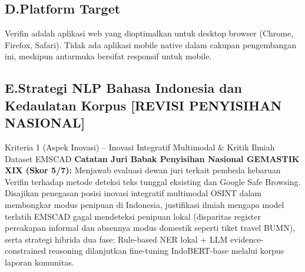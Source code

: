 \documentclass[12pt,a4paper]{article}
\begin{document}
\subsection*{D.\quad Platform Target}
Verifin adalah aplikasi web yang dioptimalkan untuk desktop browser (Chrome, Firefox, Safari).
Tidak ada aplikasi mobile native dalam cakupan pengembangan ini, meskipun antarmuka bersifat
responsif untuk mobile.

\subsection*{\colorbox{yellow!50}{\textbf{E.\quad Strategi NLP Bahasa Indonesia dan Kedaulatan Korpus}} \quad \colorbox{orange!25}{\small\textbf{[REVISI PENYISIHAN NASIONAL]}}}
{}

\begin{bannerpenyisihan}{Kriteria 1 (Aspek Inovasi) -- Inovasi Integratif Multimodal \& Kritik Ilmiah Dataset EMSCAD}
\textbf{Catatan Juri Babak Penyisihan Nasional GEMASTIK XIX (Skor 5/7):} Menjawab evaluasi dewan juri terkait pembeda kebaruan Verifin terhadap metode deteksi teks tunggal eksisting dan Google Safe Browsing. Disajikan penegasan posisi inovasi integratif multimodal OSINT dalam membongkar modus penipuan di Indonesia, justifikasi ilmiah mengapa model terlatih EMSCAD gagal mendeteksi penipuan lokal (disparitas register percakapan informal dan absennya modus domestik seperti tiket travel BUMN), serta strategi hibrida dua fase: Rule-based NER lokal + LLM evidence-constrained reasoning dilanjutkan fine-tuning IndoBERT-base melalui korpus laporan komunitas.
\end{bannerpenyisihan}
\vspace{0.2cm}
\end{document}
